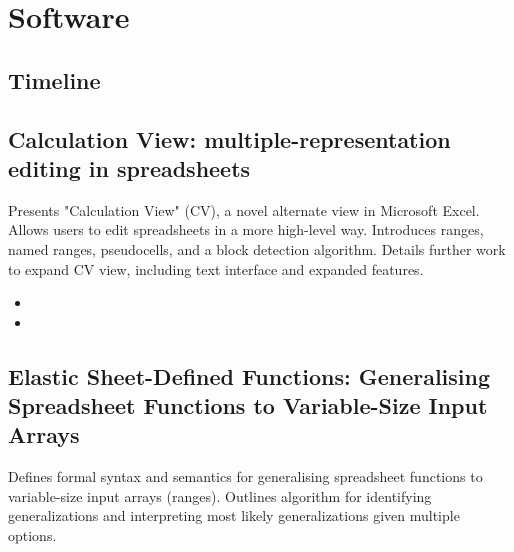 \chapter {Software}

\section{Timeline}


\section {Calculation View: multiple-representation editing in spreadsheets
\cite{sarkar2018calculation}}
Presents "Calculation View" (CV), a novel alternate view in Microsoft Excel.
Allows users to edit spreadsheets in a more high-level way. Introduces ranges,
named ranges, pseudocells, and a block detection algorithm. Details further work
to expand CV view, including text interface and expanded features.
\begin{itemize}
    \item {}
    \item {}
\end{itemize}

\section {Elastic Sheet-Defined Functions: Generalising Spreadsheet Functions to
Variable-Size Input Arrays \cite{elastic-sheet-defined-functions-generalising-spreadsheet-functions-to-variable-size-input-arrays}}
Defines formal syntax and semantics for generalising spreadsheet functions to
variable-size input arrays (ranges). Outlines algorithm for identifying
generalizations and interpreting most likely generalizations given multiple
options.